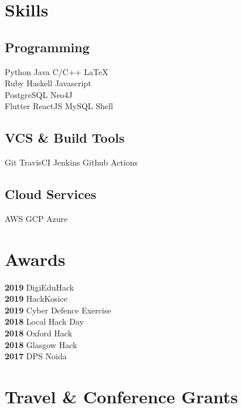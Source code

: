 \documentclass{article}
\begin{document}
\hfill
\begin{minipage}[t]{0.33\textwidth} 


\section{Skills}
\subsection{Programming}
Python \textbullet{} Java \textbullet{} C/C++ \textbullet{} \LaTeX\ \\ 
Ruby \textbullet{} Haskell \textbullet{} Javascript \\
PostgreSQL \textbullet{} Neo4J \\
Flutter \textbullet{}
ReactJS \textbullet{ }MySQL \textbullet{} Shell
\subsection{VCS \& Build Tools}
Git \textbullet{} TravisCI \textbullet{}Jenkins \textbullet{} Github Actions
\subsection{Cloud Services}
AWS \textbullet{} GCP \textbullet{} Azure
\sectionsep


\section{Awards} 

\textbf{2019 } DigiEduHack \\
\textbf{2019 } HackKosice \\
\textbf{2019 } Cyber Defence Exercise\\
\textbf{2018 } Local Hack Day\\
\textbf{2018 } Oxford Hack \\
\textbf{2018 } Glasgow Hack \\
\textbf{2017 } DPS Noida

\section{Travel \& Conference Grants}


\end{minipage}
\end{document}

